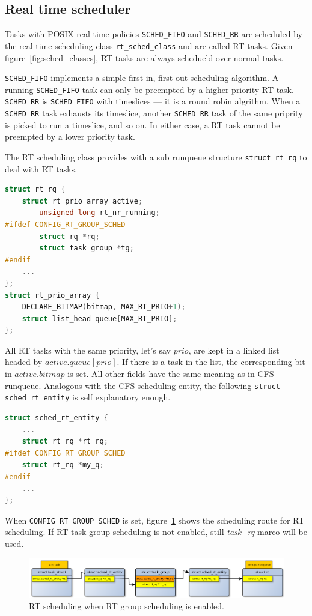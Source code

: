 \subsection{Real time scheduler\label{sec:LinuxSched_rt}}

Tasks with POSIX real time policies \texttt{SCHED\_FIFO} and \texttt{SCHED\_RR}
are scheduled by the real time scheduling class \texttt{rt\_sched\_class} and
are called RT tasks. Given figure~\vref{fig:sched_classes}, RT tasks are always
schedueld over normal tasks. 

\texttt{SCHED\_FIFO} implements a simple first-in, first-out scheduling 
algorithm. A running \texttt{SCHED\_FIFO} task can only be preempted by a 
higher priority RT task. \texttt{SCHED\_RR} is \texttt{SCHED\_FIFO} with 
timeslices --- it is a round robin algrithm. When a \texttt{SCHED\_RR}
task exhausts its timeslice, another \texttt{SCHED\_RR} task of the same
priprity is picked to run a timeslice, and so on. In either case, a RT task
cannot be preempted by a lower priority task.

The RT scheduling class provides with a sub runqueue structure 
\texttt{struct rt\_rq} to deal with RT tasks.
\begin{lstlisting}[language=C,
		caption={The RT runqueue},
		label={lst:rtrunqueue}]
struct rt_rq {
	struct rt_prio_array active;
        unsigned long rt_nr_running;
#ifdef CONFIG_RT_GROUP_SCHED
        struct rq *rq;
        struct task_group *tg;
#endif
	...
};
struct rt_prio_array {
	DECLARE_BITMAP(bitmap, MAX_RT_PRIO+1); 
	struct list_head queue[MAX_RT_PRIO];
};
\end{lstlisting}
All RT tasks with the same priority, let's say $prio$, are kept in a linked 
list headed by $active.queue[prio]$. If there is a task in the list, the 
corresponding bit in $active.bitmap$ is set. All other fields have the same
meaning as in CFS runqueue. Analogous with the CFS scheduling entity, the 
following \texttt{struct sched\_rt\_entity} is self explanatory enough. 
\begin{lstlisting}[language=C,
		caption={The RT scheduling entity},
		label={rt_entity}]
struct sched_rt_entity {
	...
	struct rt_rq *rt_rq;
#ifdef CONFIG_RT_GROUP_SCHED
	struct rt_rq *my_q;
#endif
	...
}; 
\end{lstlisting}

When \texttt{CONFIG\_RT\_GROUP\_SCHED} is set, figure~\ref{fig:rt_routing_tg} 
shows the scheduling route for RT scheduling. If RT task group scheduling is 
not enabled, still \emph{task\_rq} marco will be used.
\begin{figure}[htbp]
        \centering
        \includegraphics[width=\textwidth]{images/rt_scheduling_scheme_tg}
        \caption{RT scheduling when RT group scheduling is enabled.}
        \label{fig:rt_routing_tg}
\end{figure}

